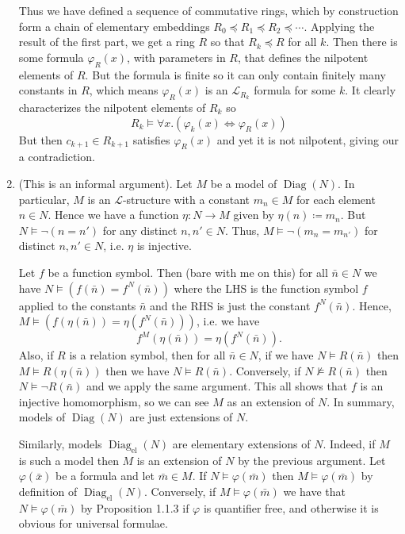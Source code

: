 \documentclass{article}
\DeclareMathOperator{\Diag}{Diag}
\begin{document}
\begin{enumerate}[leftmargin=*]
		Thus we have defined a sequence of commutative rings, which by construction form a chain of elementary embeddings $R_0\preccurlyeq R_1\preccurlyeq R_2\preccurlyeq\cdots$. Applying the result of the first part, we get a ring $R$ so that $R_k\preccurlyeq R$ for all $k$. Then there is some formula $\varphi_R(x)$, with parameters in $R$, that defines the nilpotent elements of $R$. But the formula is finite so it can only contain finitely many constants in $R$, which means $\varphi_R(x)$ is an $\mathcal{L}_{R_k}$ formula for some $k$. It clearly characterizes the nilpotent elements of $R_k$ so
		\[
			R_k\models \forall x. (\varphi_k(x) \Leftrightarrow \varphi_R(x))
		\]
		But then $c_{k+1} \in R_{k+1}$ satisfies $\varphi_R(x)$ and yet it is not nilpotent, giving our a contradiction.
		\item (This is an informal argument). Let $M$ be a model of $\Diag(N)$. In particular, $M$ is an $\mathcal{L}$-structure with a constant $m_n\in M$ for each element $n\in N$. Hence we have a function $\eta \colon N \to M$ given by $\eta(n) \coloneqq m_n$. But $N\models \neg(n = n')$ for any distinct $n,n'\in N$. Thus, $M\models \neg(m_n = m_{n'})$ for distinct $n,n'\in N$, i.e. $\eta$ is injective. 
		
		Let $f$ be a function symbol. Then (bare with me on this) for all $\bar{n}\in N$ we have $N \models (f(\bar{n}) = f^{N}(\bar{n}))$ where the LHS is the function symbol $f$ applied to the constants $\bar{n}$ and the RHS is just the constant $f^{N}(\bar{n})$. Hence, $M\models (f(\eta(\bar{n})) = \eta(f^{N}(\bar{n})))$, i.e. we have
		\[
		f^M(\eta(\bar{n})) = \eta(f^N(\bar{n})).
		\]
		Also, if $R$ is a relation symbol, then for all $\bar{n}\in N$, if we have  $N \models R(\bar{n})$ then $M \models R(\eta(\bar{n}))$ then we have $N \models R(\bar{n})$. Conversely, if $N \nvDash R(\bar{n})$ then $N\models \neg R(\bar{n})$ and we apply the same argument. This all shows that $f$ is an injective homomorphism, so we can see $M$ as an extension of $N$. In summary, models of $\Diag(N)$ are just extensions of $N$.
		
		Similarly, models $\Diag_{\text{el}}(N)$ are elementary extensions of $N$. Indeed, if $M$ is such a model then $M$ is an extension of $N$ by the previous argument. Let $\varphi(\bar{x})$ be a formula and  let $\bar{m}\in M$. If $N \models \varphi(\bar{m})$ then $M \models \varphi(\bar{m})$ by definition of $\Diag_{\text{el}}(N)$. Conversely, if $M \models \varphi(\bar{m})$ we have that $N \models \varphi(\bar{m})$ by Proposition 1.1.3 if $\varphi$ is quantifier free, and otherwise it is obvious for universal formulae.
		

\end{enumerate}
\end{document}
